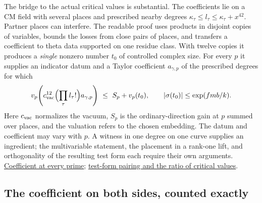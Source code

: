 \documentclass[11pt,letterpaper]{article}
\newcommand{\sref}[2]{\href{https://github.com/VladimirReshetnikov/ProveIt/blob/d8415e76ad850651f8c0083afe689dd9f4a45a10/Analysis/GeneralizedRiemannHypothesis/vendor/grh-lean/grh/src/#1.lean}{#2}}
\begin{document}
The bridge to the actual critical values is substantial. The coefficients lie on a CM field with several places and prescribed nearby degrees \(\kappa_\tau\le l_\tau\le\kappa_\tau+x^{42}\). Partner places can interfere. The readable proof uses products in disjoint copies of variables, bounds the losses from close pairs of places, and transfers a coefficient to theta data supported on one residue class. With twelve copies it produces a \emph{single} nonzero number \(t_0\) of controlled complex size. For every \(p\) it supplies an indicator datum and a Taylor coefficient \(a_{\gamma,p}\) of the prescribed degrees for which
\[
   v_p\!\left(c_{\rm vac}^{12}\Bigl(\prod_\tau l_\tau!\Bigr)a_{\gamma,p}\right)
                   \ \le\ S_p+v_p(t_0),
   \qquad |\sigma(t_0)|\le \exp(fmb/k).
\]
Here \(c_{\rm vac}\) normalizes the vacuum, \(S_p\) is the ordinary-direction gain at \(p\) summed over places, and the valuation refers to the chosen embedding. The datum and coefficient may vary with \(p\). A witness in one degree on one curve supplies an ingredient; the multivariable statement, the placement in a rank-one lift, and orthogonality of the resulting test form each require their own arguments. \sref{New/Derivatives/Sharpness/BoundAttained}{Coefficient at every prime}; \sref{New/OneLift/HeckeValues/TwistedValueHeights}{test-form pairing and the ratio of critical values}.

\subsection{The coefficient on both sides, counted exactly}
\end{document}
